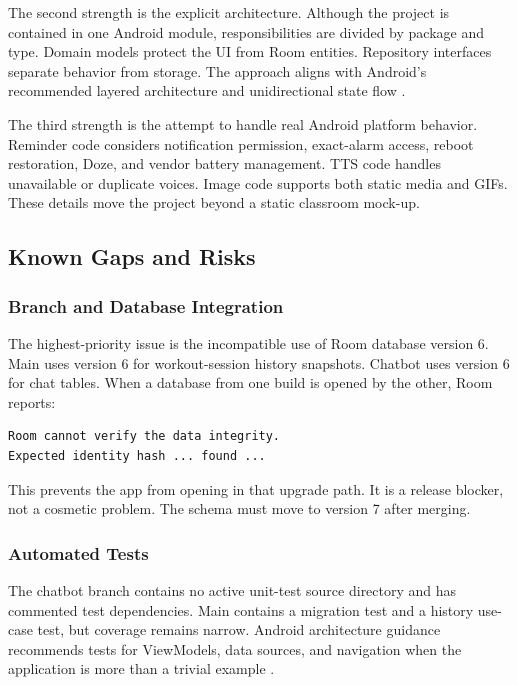 The second strength is the explicit architecture. Although the project is contained in one Android module, responsibilities are divided by package and type. Domain models protect the UI from Room entities. Repository interfaces separate behavior from storage. The approach aligns with Android's recommended layered architecture and unidirectional state flow \cite{androidrecommendations}.

The third strength is the attempt to handle real Android platform behavior. Reminder code considers notification permission, exact-alarm access, reboot restoration, Doze, and vendor battery management. TTS code handles unavailable or duplicate voices. Image code supports both static media and GIFs. These details move the project beyond a static classroom mock-up.

\subsection{Known Gaps and Risks}

\subsubsection{Branch and Database Integration}

The highest-priority issue is the incompatible use of Room database version 6. Main uses version 6 for workout-session history snapshots. Chatbot uses version 6 for chat tables. When a database from one build is opened by the other, Room reports:

\begin{lstlisting}
Room cannot verify the data integrity.
Expected identity hash ... found ...
\end{lstlisting}

This prevents the app from opening in that upgrade path. It is a release blocker, not a cosmetic problem. The schema must move to version 7 after merging.

\subsubsection{Automated Tests}

The chatbot branch contains no active unit-test source directory and has commented test dependencies. Main contains a migration test and a history use-case test, but coverage remains narrow. Android architecture guidance recommends tests for ViewModels, data sources, and navigation when the application is more than a trivial example \cite{androidrecommendations}.

